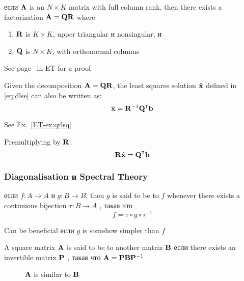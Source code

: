 \begin{frame}

     \vspace{2em}
    \Thm{\eqref{ET-t:qr}}
    если $\mathbf A$ is an $N \times K$ matrix with full column rank, then there exists a
    factorization $\mathbf A = \mathbf Q \mathbf R$ where
    \begin{enumerate}
        \item $\mathbf R$ is $K \times K$, upper triangular и nonsingular, и 
        \item $\mathbf Q$ is $N \times K$, with orthonormal columns
    \end{enumerate}
    See page~\pageref{ET-t:qr} in ET for a proof
    
\end{frame}

\begin{frame}

     \vspace{2em}
    Given the decomposition $\mathbf A = \mathbf Q \mathbf R$, the least squares solution
    $\hat {\mathbf x}$ defined in \eqref{eq:dlse} can also be written as:
    $$\hboldx =
    \boldR^{-1} \boldQ^\T \boldb$$
    
    See Ex.~\ref{ET-ex:qrlsq}
    
    \vspace{.7em}
    Premultiplying by $\mathbf R$:
    $$\boldR \hboldx = \boldQ^\T \boldb$$
    
\end{frame}

\begin{frame}\frametitle{Diagonalisation и Spectral Theory}

     \vspace{2em}
    если $f \colon A \to A$ и $g \colon B \to B$, then
    $g$ is said to be  to $f$ whenever there exists
    a continuous bijection $\tau \colon B \to A$ , такая что $$f = \tau \circ g \circ
    \tau^{-1}$$
    
    \vspace{.7em}
    Can be beneficial если $g$ is somehow simpler
    than $f$
    
\end{frame}

\begin{frame}

    \vspace{2em}
    A square matrix $\mathbf A$ is said to be  to another matrix $\mathbf B$ если there exists an invertible matrix $\mathbf P$ , такая что $\mathbf A = \mathbf P \mathbf B \mathbf P^{-1}$

    \begin{figure}
   \begin{center}
    
    \caption{\label{f:diagonalize} $\mathbf A$ is similar to $\mathbf B$}
   \end{center}
    \end{figure}
    
\end{frame}

